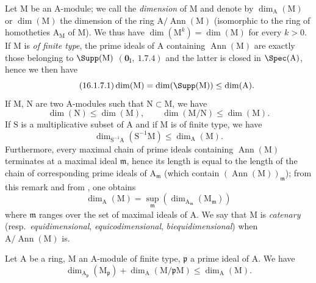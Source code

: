 \begin{env}[16.1.7]
\label{0.16.1.7}
Let $\mathrm{M}$ be an $\mathrm{A}$-module; we call the \emph{dimension} of $\mathrm{M}$ and denote by $\dim_\mathrm{A}(\mathrm{M})$ or $\dim(\mathrm{M})$ the dimension of the ring $\mathrm{A}/\operatorname{Ann}(\mathrm{M})$ (isomorphic to the ring of homotheties $\mathrm{A}_\mathrm{M}$ of $\mathrm{M}$).
We thus have $\dim(\mathrm{M}^k)=\dim(\mathrm{M})$ for every $k>0$.
If $\mathrm{M}$ is \emph{of finite type}, the prime ideals of $\mathrm{A}$ containing $\operatorname{Ann}(\mathrm{M})$ are exactly those belonging to $\Supp(\mathrm{M})$ $(\mathbf{0}_\mathrm{I},~1.7.4)$ and the latter is closed in $\Spec(\mathrm{A})$, hence we then have
\begin{equation}
\label{0.16.1.7.1}
\tag{16.1.7.1}
  \dim(\mathrm{M})=\dim(\Supp(\mathrm{M}))\leq\dim(\mathrm{A}).
\end{equation}
If $\mathrm{M}$, $\mathrm{N}$ are two $\mathrm{A}$-modules such that $\mathrm{N}\subset\mathrm{M}$, we have
\begin{equation}
\label{0.16.1.7.2}
\tag{16.1.7.2}
  \dim(\mathrm{N})\leq\dim(\mathrm{M}),\qquad\dim(\mathrm{M}/\mathrm{N})\leq\dim(\mathrm{M}).
\end{equation}
If $\mathrm{S}$ is a multiplicative subset of $\mathrm{A}$ and if $\mathrm{M}$ is of finite type, we have
\begin{equation}
\label{0.16.1.7.3}
\tag{16.1.7.3}
  \dim_{\mathrm{S}^{-1}\mathrm{A}}(\mathrm{S}^{-1}\mathrm{M})\leq\dim_\mathrm{A}(\mathrm{M}).
\end{equation}
Furthermore, every maximal chain of prime ideals containing $\operatorname{Ann}(\mathrm{M})$ terminates at a maximal ideal $\mathfrak{m}$, hence its length is equal to the length of the chain of corresponding prime ideals of $\mathrm{A}_\mathfrak{m}$ (which contain $(\operatorname{Ann}(\mathrm{M}))_\mathfrak{m}$); from this remark and from , one obtains
\begin{equation}
\label{0.16.1.7.4}
\tag{16.1.7.4}
  \dim_\mathrm{A}(\mathrm{M})=\sup_\mathfrak{m}(\dim_{\mathrm{A}_\mathfrak{m}}(\mathrm{M}_\mathfrak{m}))
\end{equation}
where $\mathfrak{m}$ ranges over the set of maximal ideals of $\mathrm{A}$.
We say that $\mathrm{M}$ is \emph{catenary} (resp.~\emph{equidimensional}, \emph{equicodimensional}, \emph{biequidimensional}) when $\mathrm{A}/\operatorname{Ann}(\mathrm{M})$ is.
\end{env}

\begin{proposition}[16.1.8]
\label{0.16.1.8}
Let $\mathrm{A}$ be a ring, $\mathrm{M}$ an $\mathrm{A}$-module of finite type, $\mathfrak{p}$ a prime ideal of $\mathrm{A}$.
We have
\begin{equation}
\label{0.16.1.8.1}
\tag{16.1.8.1}
  \dim_{\mathrm{A}_\mathfrak{p}}(\mathrm{M}_\mathfrak{p})+\dim_\mathrm{A}(\mathrm{M}/\mathfrak{p}\mathrm{M})\leq\dim_\mathrm{A}(\mathrm{M}).
\end{equation}
\end{proposition}

